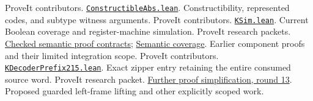 \documentclass[11pt]{article}
\theoremstyle{remark}\newtheorem{remark}[theorem]{Remark}
\newcommand{\source}[2]{\href{https://github.com/VladimirReshetnikov/ProveIt/blob/cbf94cb552a3b49509e0eee80e7455d4eb5974c6/#1}{#2}}
\begin{document}
\begin{thebibliography}{99}
 ProveIt contributors. \source{Computability/BusyBeaver/Lean/BusyBeaver/ZFC/ConstructibleAbs.lean}{\texttt{ConstructibleAbs.lean}}. Constructibility, represented codes, and subtype witness arguments.
 ProveIt contributors. \source{Computability/BusyBeaver/Lean/BusyBeaver/ZFC/KSim.lean}{\texttt{KSim.lean}}. Current Boolean coverage and register-machine simulation.
 ProveIt research packets. \source{Computability/BusyBeaver/Research/ZFC/k225-formal/verification/k215/simplification/proposals/proof-contracts/lean/README.md}{Checked semantic proof contracts}; \source{Computability/BusyBeaver/Research/ZFC/k225-formal/verification/k215/simplification/proposals/semantic-coverage/README.md}{Semantic coverage}. Earlier component proofs and their limited integration scope.
 ProveIt contributors. \source{Computability/BusyBeaver/Lean/BusyBeaver/ZFC/KDecoderPrefix215.lean}{\texttt{KDecoderPrefix215.lean}}. Exact zipper entry retaining the entire consumed source word.
 ProveIt research packet. \source{Computability/BusyBeaver/Research/ZFC/k225-formal/verification/k215/simplification/proposals/round13-left-frame/README.md}{Further proof simplification, round 13}. Proposed guarded left-frame lifting and other explicitly scoped work.
\end{thebibliography}
\end{document}
